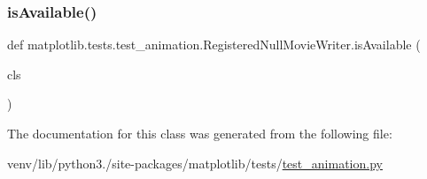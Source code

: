 \subsubsection{\texorpdfstring{is\+Available()}{isAvailable()}}
{\footnotesize\ttfamily def matplotlib.\+tests.\+test\+\_\+animation.\+Registered\+Null\+Movie\+Writer.\+is\+Available (\begin{DoxyParamCaption}\item[{}]{cls }\end{DoxyParamCaption})}



The documentation for this class was generated from the following file\+:\begin{DoxyCompactItemize}
\item 
venv/lib/python3./site-\/packages/matplotlib/tests/\hyperlink{test__animation_8py}{test\+\_\+animation.\+py}\end{DoxyCompactItemize}
